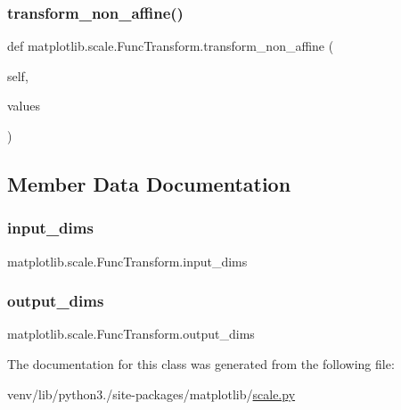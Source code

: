 \subsubsection{\texorpdfstring{transform\+\_\+non\+\_\+affine()}{transform\_non\_affine()}}
{\footnotesize\ttfamily def matplotlib.\+scale.\+Func\+Transform.\+transform\+\_\+non\+\_\+affine (\begin{DoxyParamCaption}\item[{}]{self,  }\item[{}]{values }\end{DoxyParamCaption})}



\subsection{Member Data Documentation}
\mbox{\label{classmatplotlib_1_1scale_1_1FuncTransform_ad8d6cd365042d469e74937caaba2c1e2}} 
\subsubsection{\texorpdfstring{input\+\_\+dims}{input\_dims}}
{\footnotesize\ttfamily matplotlib.\+scale.\+Func\+Transform.\+input\+\_\+dims\hspace{0.3cm}{\ttfamily [static]}}

\mbox{\label{classmatplotlib_1_1scale_1_1FuncTransform_a6612724ca3327805cb103f4879ca7c3c}} 
\subsubsection{\texorpdfstring{output\+\_\+dims}{output\_dims}}
{\footnotesize\ttfamily matplotlib.\+scale.\+Func\+Transform.\+output\+\_\+dims\hspace{0.3cm}{\ttfamily [static]}}



The documentation for this class was generated from the following file\+:\begin{DoxyCompactItemize}
\item 
venv/lib/python3./site-\/packages/matplotlib/\hyperlink{scale_8py}{scale.\+py}\end{DoxyCompactItemize}

